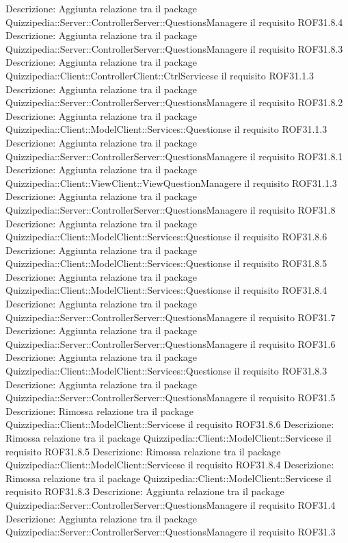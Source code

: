 Descrizione: Aggiunta relazione tra il package Quizzipedia::Server::ControllerServer::QuestionsManagere il requisito ROF31.8.4 
Descrizione: Aggiunta relazione tra il package Quizzipedia::Server::ControllerServer::QuestionsManagere il requisito ROF31.8.3 
Descrizione: Aggiunta relazione tra il package Quizzipedia::Client::ControllerClient::CtrlServicese il requisito ROF31.1.3 
Descrizione: Aggiunta relazione tra il package Quizzipedia::Server::ControllerServer::QuestionsManagere il requisito ROF31.8.2 
Descrizione: Aggiunta relazione tra il package Quizzipedia::Client::ModelClient::Services::Questionse il requisito ROF31.1.3 
Descrizione: Aggiunta relazione tra il package Quizzipedia::Server::ControllerServer::QuestionsManagere il requisito ROF31.8.1 
Descrizione: Aggiunta relazione tra il package Quizzipedia::Client::ViewClient::ViewQuestionManagere il requisito ROF31.1.3 
Descrizione: Aggiunta relazione tra il package Quizzipedia::Server::ControllerServer::QuestionsManagere il requisito ROF31.8 
Descrizione: Aggiunta relazione tra il package Quizzipedia::Client::ModelClient::Services::Questionse il requisito ROF31.8.6 
Descrizione: Aggiunta relazione tra il package Quizzipedia::Client::ModelClient::Services::Questionse il requisito ROF31.8.5 
Descrizione: Aggiunta relazione tra il package Quizzipedia::Client::ModelClient::Services::Questionse il requisito ROF31.8.4 
Descrizione: Aggiunta relazione tra il package Quizzipedia::Server::ControllerServer::QuestionsManagere il requisito ROF31.7 
Descrizione: Aggiunta relazione tra il package Quizzipedia::Server::ControllerServer::QuestionsManagere il requisito ROF31.6 
Descrizione: Aggiunta relazione tra il package Quizzipedia::Client::ModelClient::Services::Questionse il requisito ROF31.8.3 
Descrizione: Aggiunta relazione tra il package Quizzipedia::Server::ControllerServer::QuestionsManagere il requisito ROF31.5 
Descrizione: Rimossa relazione tra il package Quizzipedia::Client::ModelClient::Servicese il requisito ROF31.8.6 
Descrizione: Rimossa relazione tra il package Quizzipedia::Client::ModelClient::Servicese il requisito ROF31.8.5 
Descrizione: Rimossa relazione tra il package Quizzipedia::Client::ModelClient::Servicese il requisito ROF31.8.4 
Descrizione: Rimossa relazione tra il package Quizzipedia::Client::ModelClient::Servicese il requisito ROF31.8.3 
Descrizione: Aggiunta relazione tra il package Quizzipedia::Server::ControllerServer::QuestionsManagere il requisito ROF31.4 
Descrizione: Aggiunta relazione tra il package Quizzipedia::Server::ControllerServer::QuestionsManagere il requisito ROF31.3 
